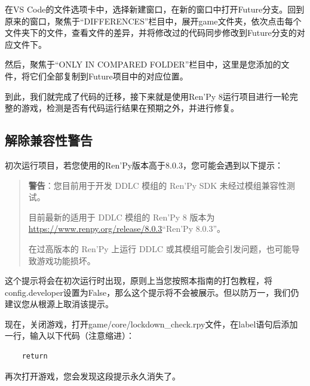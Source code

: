 \documentclass[../../Main.tex]{subfiles}
\begin{document}
在VS Code的文件选项卡中，选择新建窗口，在新的窗口中打开Future分支。回到原来的窗口，聚焦于“DIFFERENCES”栏目中，展开game文件夹，依次点击每个文件夹下的文件，查看文件的差异，并将修改过的代码同步修改到Future分支的对应文件下。

然后，聚焦于“ONLY IN COMPARED FOLDER”栏目中，这里是您添加的文件，将它们全部复制到Future项目中的对应位置。

到此，我们就完成了代码的迁移，接下来就是使用Ren'Py 8运行项目进行一轮完整的游戏，检测是否有代码运行结果在预期之外，并进行修复。

\subsection{解除兼容性警告}
初次运行项目，若您使用的Ren'Py版本高于8.0.3，您可能会遇到以下提示：

\begin{quote}
    \textbf{警告}：您目前用于开发 DDLC 模组的 Ren'Py SDK 未经过模组兼容性测试。

    目前最新的适用于 DDLC 模组的 Ren'Py 8 版本为\url{https://www.renpy.org/release/8.0.3}“Ren'Py 8.0.3”。
    
    在过高版本的 Ren'Py 上运行 DDLC 或其模组可能会引发问题，也可能导致游戏功能损坏。
\end{quote}

这个提示将会在初次运行时出现，原则上当您按照本指南的打包教程，将config.developer设置为False，那么这个提示将不会被展示。但以防万一，我们仍建议您从根源上取消该提示。

现在，关闭游戏，打开game/core/lockdown\_check.rpy文件，在label语句后添加一行，输入以下代码（注意缩进）：
\begin{lstlisting}
    return
\end{lstlisting}

再次打开游戏，您会发现这段提示永久消失了。
\end{document}
